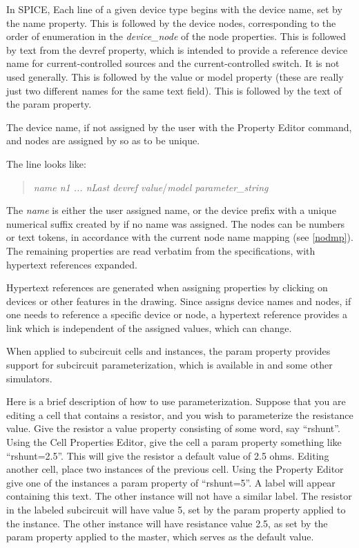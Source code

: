 \label {spiceline}
In SPICE, Each line of a given device type begins with the device
name, set by the {\et name} property.  This is followed by the device
nodes, corresponding to the order of enumeration in the {\it
device\_node\/} of the {\et node} properties.  This is followed by
text from the {\et devref} property, which is intended to provide a
reference device name for current-controlled sources and the
current-controlled switch.  It is not used generally.  This is
followed by the {\et value} or {\et model} property (these are really
just two different names for the same text field).  This is followed
by the text of the {\et param} property.

The device name, if not assigned by the user with the {\cb Property
Editor} command, and nodes are assigned by {\Xic} so as to be unique.

The line looks like:
\begin{quote}
{\it name n1 ... nLast devref value\/}/{\it model parameter\_string}
\end{quote}

The {\it name} is either the user assigned name, or the device prefix
with a unique numerical suffix created by {\Xic} if no name was
assigned.  The nodes can be numbers or text tokens, in accordance with
the current node name mapping (see \ref{nodmp}).  The remaining
properties are read verbatim from the specifications, with hypertext
references expanded.

Hypertext references are generated when assigning properties by
clicking on devices or other features in the drawing.  Since {\Xic}
assigns device names and nodes, if one needs to reference a specific
device or node, a hypertext reference provides a link which is
independent of the assigned values, which can change.

When applied to subcircuit cells and instances, the {\cb param}
property provides support for subcircuit parameterization, which is
available in {\WRspice} and some other simulators.

Here is a brief description of how to use parameterization.  Suppose
that you are editing a cell that contains a resistor, and you wish to
parameterize the resistance value.  Give the resistor a {\et value}
property consisting of some word, say ``{\vt rshunt}''.  Using the
{\cb Cell Properties Editor}, give the cell a {\et param} property
something like ``{\vt rshunt=2.5}''.  This will give the resistor a
default value of 2.5 ohms.  Editing another cell, place two instances
of the previous cell.  Using the {\cb Property Editor} give one of the
instances a {\et param} property of ``{\vt rshunt=5}''.  A label will
appear containing this text.  The other instance will not have a
similar label.  The resistor in the labeled subcircuit will have value
5, set by the {\et param} property applied to the instance.  The
other instance will have resistance value 2.5, as set by the {\et
param} property applied to the master, which serves as the default
value.


